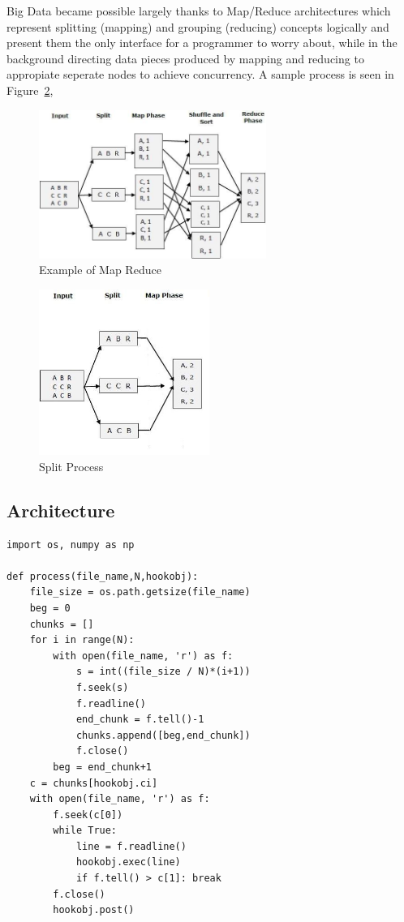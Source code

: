 \documentclass{article}
\begin{document}
Big Data became possible largely thanks to Map/Reduce architectures which
represent splitting (mapping) and grouping (reducing) concepts logically and
present them the only interface for a programmer to worry about, while in the
background directing data pieces produced by mapping and reducing to appropiate
seperate nodes to achieve concurrency. A sample process is seen in
Figure~\ref{fig:mapreduce1},

\begin{figure}[h]
  \centering
  \includegraphics[width=20em]{mapreduce1.jpg}
  \caption{Example of Map Reduce}
  \label{fig:mapreduce1}
\end{figure}

\begin{figure}[h]
  \centering
  \includegraphics[width=15em]{splitprocess.jpg}
  \caption{Split Process}
  \label{fig:mapreduce1}
\end{figure}

\subsection{Architecture}

\begin{verbatim}
import os, numpy as np

def process(file_name,N,hookobj):
    file_size = os.path.getsize(file_name)
    beg = 0
    chunks = []
    for i in range(N):
        with open(file_name, 'r') as f:
            s = int((file_size / N)*(i+1))
            f.seek(s)
            f.readline()
            end_chunk = f.tell()-1
            chunks.append([beg,end_chunk])
            f.close()
        beg = end_chunk+1
    c = chunks[hookobj.ci]
    with open(file_name, 'r') as f:
        f.seek(c[0])
        while True:
            line = f.readline()
            hookobj.exec(line)
            if f.tell() > c[1]: break
        f.close()
        hookobj.post()
\end{verbatim}
\end{document}
